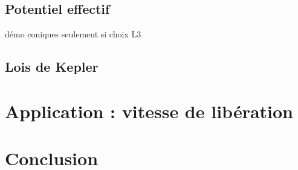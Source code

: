\subsection{Potentiel effectif}
démo coniques seulement si choix L3
\subsection{Lois de Kepler}
\section{Application : vitesse de libération}
\section*{Conclusion}

%
%
%
%
%



